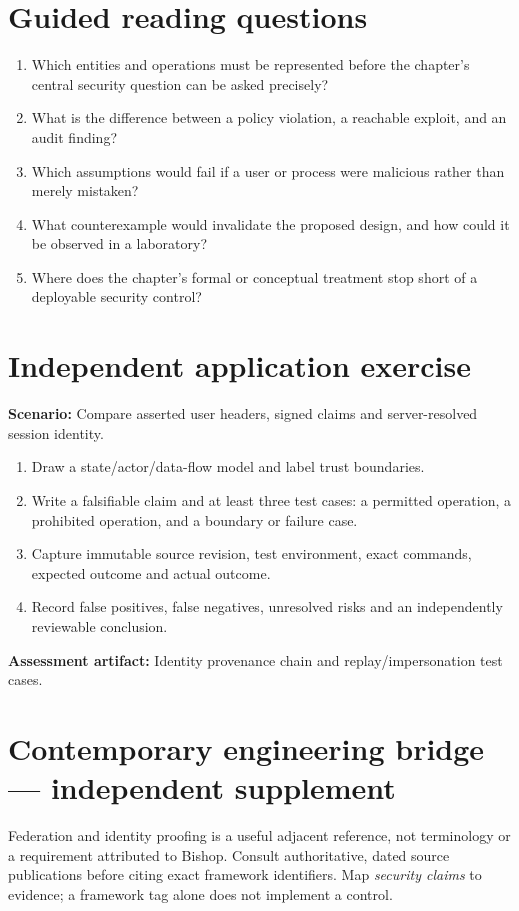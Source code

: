 \documentclass[10pt,letterpaper]{article}
\begin{document}
\section{Guided reading questions}
\begin{enumerate}
\item Which entities and operations must be represented before the chapter's central security question can be asked precisely?
\item What is the difference between a policy violation, a reachable exploit, and an audit finding?
\item Which assumptions would fail if a user or process were malicious rather than merely mistaken?
\item What counterexample would invalidate the proposed design, and how could it be observed in a laboratory?
\item Where does the chapter's formal or conceptual treatment stop short of a deployable security control?
\end{enumerate}
\section{Independent application exercise}
\textbf{Scenario:} Compare asserted user headers, signed claims and server-resolved session identity.
\begin{enumerate}
\item Draw a state/actor/data-flow model and label trust boundaries.
\item Write a falsifiable claim and at least three test cases: a permitted operation, a prohibited operation, and a boundary or failure case.
\item Capture immutable source revision, test environment, exact commands, expected outcome and actual outcome.
\item Record false positives, false negatives, unresolved risks and an independently reviewable conclusion.
\end{enumerate}
\textbf{Assessment artifact:} Identity provenance chain and replay/impersonation test cases.
\section{Contemporary engineering bridge --- independent supplement}
Federation and identity proofing is a useful adjacent reference, not terminology or a requirement attributed to Bishop. Consult authoritative, dated source publications before citing exact framework identifiers. Map \emph{security claims} to evidence; a framework tag alone does not implement a control.
\end{document}
